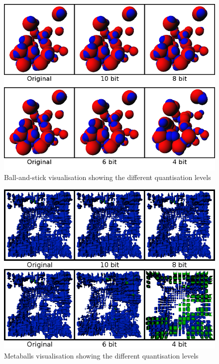 \begin{figure}
  \begin{center}
    \includegraphics[width=120mm]{ballstick4680}
  \end{center}
  \caption{Ball-and-stick visualisation showing the different quantisation
  levels}
  \label{fig:experiment_ballstick4680}
\end{figure}

\begin{figure}
  \begin{center}
    \includegraphics[width=120mm]{metaballs4680}
  \end{center}
  \caption{Metaballs visualisation showing the different quantisation
  levels}
  \label{fig:experiment_metaballs4680}
\end{figure}


